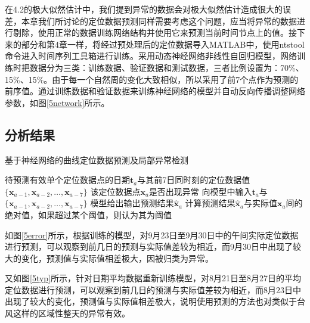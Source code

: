 \documentclass[a4paper,AutoFakeBold,oneside,12pt]{book}
\begin{document}

	在4.2的极大似然估计中，我们提到异常的数据会对极大似然估计造成很大的误差，本章我们所讨论的定位数据预测同样需要考虑这个问题，应当将异常的数据进行剔除，使用正常的数据训练网络结构并使用它来预测当前时间节点上的值。接下来的部分和第4章一样，将经过预处理后的定位数据导入MATLAB中，使用ntstool命令进入时间序列工具箱进行训练。采用动态神经网络非线性自回归模型，网络训练时把数据分为三类：训练数据、验证数据和测试数据，三者比例设置为：70\%、15\%、15\%。由于每一个自然周的变化大致相似，所以采用了前7个点作为预测的前序值。通过训练数据和验证数据来训练神经网络的模型并自动反向传播调整网络参数，如图\ref{5network}所示。


\subsection{分析结果}

\begin{algorithm} 
\caption{基于神经网络的曲线定位数据预测及局部异常检测} 
\label{a42}
\renewcommand{\algorithmicrequire}{\textbf{输入：}}
\renewcommand{\algorithmicensure}{\textbf{输出：}} 
\begin{algorithmic}[1] 
\Require 待预测有效单个定位数据点的日期$\bm{t}_a$与其前7日同时刻的定位数据值$\{\bm{x}_{a-1},\bm{x}_{a-2},\ldots,\bm{x}_{a-7}\}$
\Ensure 该定位数据点$\bm{x}_a$是否出现异常
\State  向模型中输入$\bm{t}_a$与$\{\bm{x}_{a-1},\bm{x}_{a-2},\ldots,\bm{x}_{a-7}\}$
\State 模型给出输出预测结果$\bm{\hat{x}}_a$
\State 计算预测结果$\bm{\hat{x}}_a$与实际值$\bm{x}_a$间的绝对值，如果超过某个阈值，则认为其为阈值
\end{algorithmic}  
\end{algorithm}

	如图\ref{5error}所示，根据训练的模型，对9月23日至9月30日中的午间实际定位数据进行预测，可以观察到前几日的预测与实际值差较为相近，而9月30日中出现了较大的变化，预测值与实际值相差极大，因被归类为异常。


	又如图\ref{5typ}所示，针对日期平均数据重新训练模型，对8月21日至8月27日的平均定位数据进行预测，可以观察到前几日的预测与实际值差较为相近，而8月23日中出现了较大的变化，预测值与实际值相差极大，说明使用预测的方法也对类似于台风这样的区域性整天的异常有效。
\end{document}
